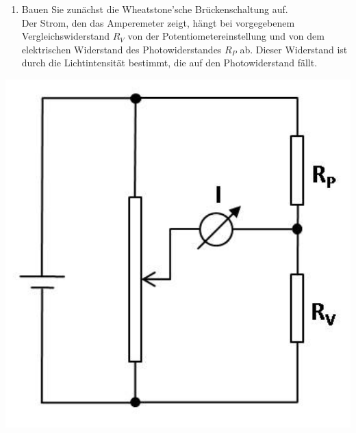 \begin{minipage}{0.6\textwidth}
 \begin{enumerate}
  \item Bauen Sie zunächst die Wheatstone'sche Brückenschaltung auf.\\
  
   Der Strom, den das Amperemeter zeigt, hängt bei vorgegebenem Vergleichswiderstand $R_V$ von der Potentiometereinstellung und von dem elektrischen Widerstand des Photowiderstandes $R_P$ ab. Dieser
   Widerstand ist durch die Lichtintensität bestimmt, die auf den Photowiderstand fällt.
 \end{enumerate}
\end{minipage}
%
\begin{minipage}{0.35\textwidth}
 \includegraphics[width=1.00\textwidth]{Abbildungen/Wheatstone14.jpg}
\end{minipage}

